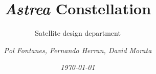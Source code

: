 \documentclass[12pt, titlepage]{scrartcl}
\title{\textbf{\textit{Astrea}} Constellation }
\subtitle{Satellite design department \vspace{7cm}}
\author{\emph{Pol Fontanes, Fernando Herran, David Morata}}
\date{\textit{\today}}
\begin{document}

\pagebreak

\pagebreak

\pagebreak

\pagebreak

\end{document}
